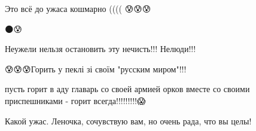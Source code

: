  
 
 
 
 

\qqSecCmt


Это всё до ужаса кошмарно (((( 😰😰😰

🌑😰


Неужели нельзя остановить эту нечисть!!! Нелюди!!!


😰😰😰Горить у пеклі зі своїм "русским миром"!!!


пусть горит в аду главарь со своей армией орков вместе со своими приспешниками - горит всегда!!!!!!!!!😱


Какой ужас. Леночка, сочувствую вам, но очень рада, что вы целы!
